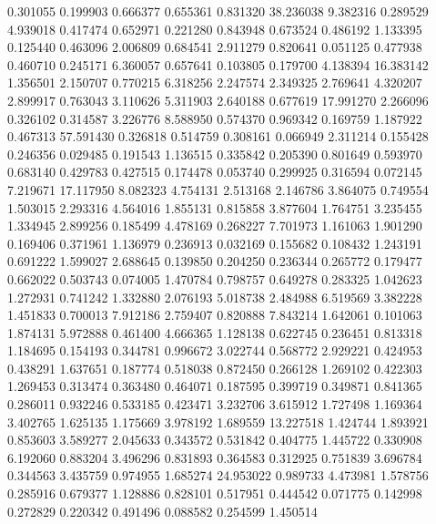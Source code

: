 0.301055
0.199903
0.666377
0.655361
0.831320
38.236038
9.382316
0.289529
4.939018
0.417474
0.652971
0.221280
0.843948
0.673524
0.486192
1.133395
0.125440
0.463096
2.006809
0.684541
2.911279
0.820641
0.051125
0.477938
0.460710
0.245171
6.360057
0.657641
0.103805
0.179700
4.138394
16.383142
1.356501
2.150707
0.770215
6.318256
2.247574
2.349325
2.769641
4.320207
2.899917
0.763043
3.110626
5.311903
2.640188
0.677619
17.991270
2.266096
0.326102
0.314587
3.226776
8.588950
0.574370
0.969342
0.169759
1.187922
0.467313
57.591430
0.326818
0.514759
0.308161
0.066949
2.311214
0.155428
0.246356
0.029485
0.191543
1.136515
0.335842
0.205390
0.801649
0.593970
0.683140
0.429783
0.427515
0.174478
0.053740
0.299925
0.316594
0.072145
7.219671
17.117950
8.082323
4.754131
2.513168
2.146786
3.864075
0.749554
1.503015
2.293316
4.564016
1.855131
0.815858
3.877604
1.764751
3.235455
1.334945
2.899256
0.185499
4.478169
0.268227
7.701973
1.161063
1.901290
0.169406
0.371961
1.136979
0.236913
0.032169
0.155682
0.108432
1.243191
0.691222
1.599027
2.688645
0.139850
0.204250
0.236344
0.265772
0.179477
0.662022
0.503743
0.074005
1.470784
0.798757
0.649278
0.283325
1.042623
1.272931
0.741242
1.332880
2.076193
5.018738
2.484988
6.519569
3.382228
1.451833
0.700013
7.912186
2.759407
0.820888
7.843214
1.642061
0.101063
1.874131
5.972888
0.461400
4.666365
1.128138
0.622745
0.236451
0.813318
1.184695
0.154193
0.344781
0.996672
3.022744
0.568772
2.929221
0.424953
0.438291
1.637651
0.187774
0.518038
0.872450
0.266128
1.269102
0.422303
1.269453
0.313474
0.363480
0.464071
0.187595
0.399719
0.349871
0.841365
0.286011
0.932246
0.533185
0.423471
3.232706
3.615912
1.727498
1.169364
3.402765
1.625135
1.175669
3.978192
1.689559
13.227518
1.424744
1.893921
0.853603
3.589277
2.045633
0.343572
0.531842
0.404775
1.445722
0.330908
6.192060
0.883204
3.496296
0.831893
0.364583
0.312925
0.751839
3.696784
0.344563
3.435759
0.974955
1.685274
24.953022
0.989733
4.473981
1.578756
0.285916
0.679377
1.128886
0.828101
0.517951
0.444542
0.071775
0.142998
0.272829
0.220342
0.491496
0.088582
0.254599
1.450514
